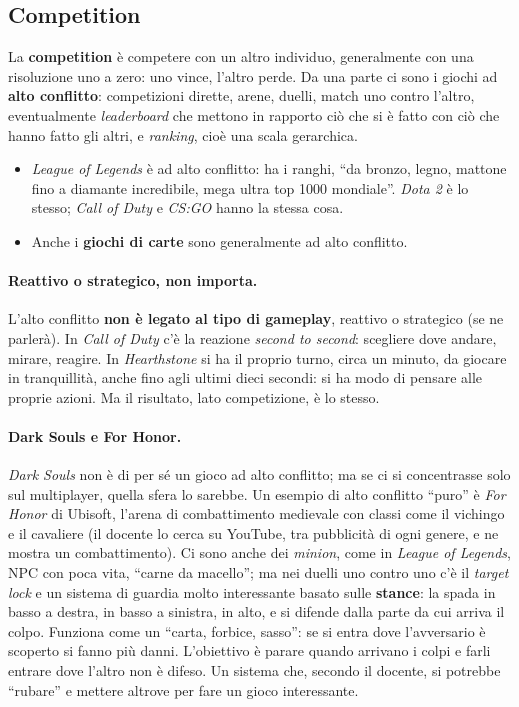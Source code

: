 \subsection{Competition}

La \textbf{competition} è competere con un altro individuo, generalmente con
una risoluzione uno a zero: uno vince, l'altro perde. Da una parte ci sono i
giochi ad \textbf{alto conflitto}: competizioni dirette, arene, duelli, match
uno contro l'altro, eventualmente \emph{leaderboard} che mettono in rapporto
ciò che si è fatto con ciò che hanno fatto gli altri, e \emph{ranking}, cioè
una scala gerarchica.
\begin{itemize}
  \item \emph{League of Legends} è ad alto conflitto: ha i ranghi, ``da
        bronzo, legno, mattone fino a diamante incredibile, mega ultra top
        1000 mondiale''. \emph{Dota 2} è lo stesso; \emph{Call of Duty} e
        \emph{CS:GO} hanno la stessa cosa.
  \item Anche i \textbf{giochi di carte} sono generalmente ad alto conflitto.
\end{itemize}

\paragraph{Reattivo o strategico, non importa.} L'alto conflitto
\textbf{non è legato al tipo di gameplay}, reattivo o strategico (se ne
parlerà). In \emph{Call of Duty} c'è la reazione \emph{second to second}:
scegliere dove andare, mirare, reagire. In \emph{Hearthstone} si ha il proprio
turno, circa un minuto, da giocare in tranquillità, anche fino agli ultimi
dieci secondi: si ha modo di pensare alle proprie azioni. Ma il risultato,
lato competizione, è lo stesso.

\paragraph{Dark Souls e For Honor.} \emph{Dark Souls} non è di per sé un gioco
ad alto conflitto; ma se ci si concentrasse solo sul multiplayer, quella
sfera lo sarebbe. Un esempio di alto conflitto ``puro'' è \emph{For Honor} di
Ubisoft, l'arena di combattimento medievale con classi come il vichingo e il
cavaliere (il docente lo cerca su YouTube, tra pubblicità di ogni genere, e
ne mostra un combattimento). Ci sono anche dei \emph{minion}, come in
\emph{League of Legends}, NPC con poca vita, ``carne da macello''; ma nei
duelli uno contro uno c'è il \emph{target lock} e un sistema di guardia molto
interessante basato sulle \textbf{stance}: la spada in basso a destra, in
basso a sinistra, in alto, e si difende dalla parte da cui arriva il colpo.
Funziona come un ``carta, forbice, sasso'': se si entra dove l'avversario è
scoperto si fanno più danni. L'obiettivo è parare quando arrivano i colpi e
farli entrare dove l'altro non è difeso. Un sistema che, secondo il docente,
si potrebbe ``rubare'' e mettere altrove per fare un gioco interessante.

